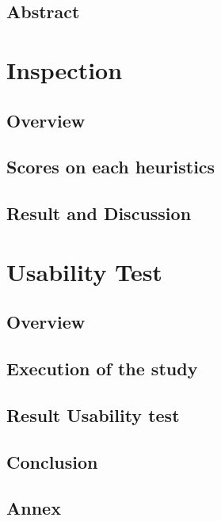\documentclass[fontsize=11pt,paper=a4,pagesize=auto]{report}
\begin{document}
\tableofcontents
\chapter{Abstract}


\part{Inspection}

\chapter{Overview}
 

\chapter{Scores on each heuristics}



\chapter{Result and Discussion}



\part{Usability Test}

\chapter{Overview}


\chapter{Execution of the study}


\chapter{Result Usability test}


\chapter{Conclusion}


\appendix
\chapter{Annex}

\end{document}
